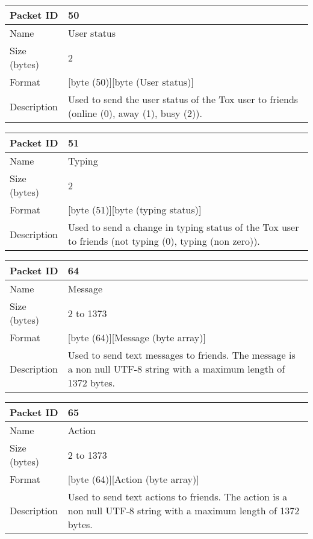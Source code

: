 \documentclass{tox}
\begin{document}
\begin{tabular}[pos]{|l|p{9cm}|}

\hline
Packet ID       &      50
\\ \hline
Name            &      User status
\\ \hline
Size (bytes)    &      2
\\ \hline
Format          &      [byte (50)][byte (User status)]
\\ \hline
Description     &      Used to send the user status of the Tox user to friends 
                       (online (0), away (1), busy (2)). 
\\ \hline
\end{tabular}

\begin{tabular}[pos]{|l|p{9cm}|}

\hline
Packet ID       &      51
\\ \hline
Name            &      Typing
\\ \hline
Size (bytes)    &      2
\\ \hline
Format          &      [byte (51)][byte (typing status)]
\\ \hline
Description     &      Used to send a change in typing status of the Tox user 
                       to friends (not typing (0), typing (non zero)). 
\\ \hline

\end{tabular}

\begin{tabular}[pos]{|l|p{9cm}|}

\hline
Packet ID       &      64
\\ \hline
Name            &      Message
\\ \hline
Size (bytes)    &      2 to 1373
\\ \hline
Format          &      [byte (64)][Message (byte array)]
\\ \hline
Description     &      Used to send text messages to friends. The message is 
                       a non null UTF-8 string with a maximum length of 1372 bytes.
\\ \hline

\end{tabular}

\begin{tabular}[pos]{|l|p{9cm}|}

\hline
Packet ID       &      65
\\ \hline
Name            &      Action
\\ \hline
Size (bytes)    &      2 to 1373
\\ \hline
Format          &      [byte (64)][Action (byte array)]
\\ \hline
Description     &      Used to send text actions to friends. The action is 
                       a non null UTF-8 string with a maximum length of 1372 bytes.
\\ \hline

\end{tabular}
\end{document}

